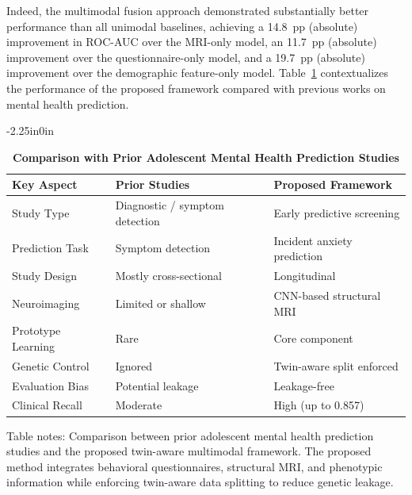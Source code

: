\documentclass[10pt,letterpaper]{article}
\begin{document}
                                                                                                                         Indeed, the multimodal fusion approach demonstrated substantially better performance than all unimodal baselines, achieving a 14.8~pp (absolute) improvement in ROC-AUC over the MRI-only model, an 11.7~pp (absolute) improvement over the questionnaire-only model, and a 19.7~pp (absolute) improvement over the demographic feature-only model. Table~\ref{tab:prior_comparison} contextualizes the performance of the proposed framework compared with previous works on mental health prediction.


                                                                                                                          \begin{table}[!t]
\begin{adjustwidth}{-2.25in}{0in}
\centering
\caption{\textbf{Comparison with Prior Adolescent Mental Health Prediction Studies}}
\label{tab:prior_comparison}
\footnotesize
\renewcommand{\arraystretch}{1.15}

\begin{tabular}{|p{5.0cm}|p{5.5cm}|p{5.5cm}|}
\hline
\textbf{Key Aspect} & \textbf{Prior Studies} & \textbf{Proposed Framework} \\
\hline
Study Type & Diagnostic / symptom detection & Early predictive screening \\
\hline
Prediction Task & Symptom detection & Incident anxiety prediction \\
\hline
Study Design & Mostly cross-sectional & Longitudinal \\
\hline
Neuroimaging & Limited or shallow & CNN-based structural MRI \\
\hline
Prototype Learning & Rare & Core component \\
\hline
Genetic Control & Ignored & Twin-aware split enforced \\
\hline
Evaluation Bias & Potential leakage & Leakage-free \\
\hline
Clinical Recall & Moderate & High (up to 0.857) \\
\hline
\end{tabular}

\begin{flushleft}
Table notes: Comparison between prior adolescent mental health prediction studies
and the proposed twin-aware multimodal framework. The proposed method integrates
behavioral questionnaires, structural MRI, and phenotypic information while
enforcing twin-aware data splitting to reduce genetic leakage.
\end{flushleft}

\end{adjustwidth}
\end{table}
\end{document}
